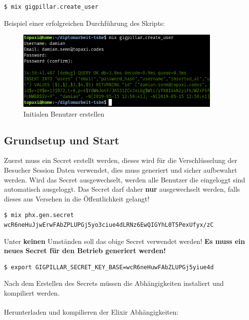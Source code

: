 \begin{lstlisting}[language=bash,frame=single]
$ mix gigpillar.create_user
\end{lstlisting}

\noindent{}Beispiel einer erfolgreichen Durchführung des Skripts:

\begin{figure}[!htb]
	\centering
	\includegraphics[width=0.9\textwidth]{einfuehrung/create-user.png}
	\caption{Initialen Benutzer erstellen}
\end{figure}

\clearpage
\subsection{Grundsetup und Start}

Zuerst muss ein Secret erstellt werden, dieses wird für die Verschlüsselung der
Besucher Session Daten verwendet, dies muss generiert und sicher aufbewahrt
werden. Wird das Secret ausgewechselt, werden alle Benutzer die eingeloggt sind
automatisch ausgeloggt. Das Secret darf daher \textbf{nur} ausgewechselt
werden, falls dieses aus Versehen in die Öffentlichkeit gelangt!

\begin{lstlisting}[language=bash,frame=single]
$ mix phx.gen.secret
wcR6neHuJjwErwFAbZPLUPGj5yo3ciue4dLRNz6EwQIGYhL0T5PexUfyx/zC
\end{lstlisting}

\noindent{}Unter \textbf{keinen} Umständen soll das obige Secret verwendet werden!
\textbf{Es muss ein neues Secret für den Betrieb generiert werden!}

\begin{lstlisting}[language=bash,frame=single]
$ export GIGPILLAR_SECRET_KEY_BASE=wcR6neHuwFAbZLUPGj5yiue4d
\end{lstlisting}

\noindent{}Nach dem Erstellen des Secrets müssen die Abhängigkeiten instaliert und
kompiliert werden.\\
\\
\noindent{}Herunterladen und kompilieren der Elixir Abhängigkeiten:


